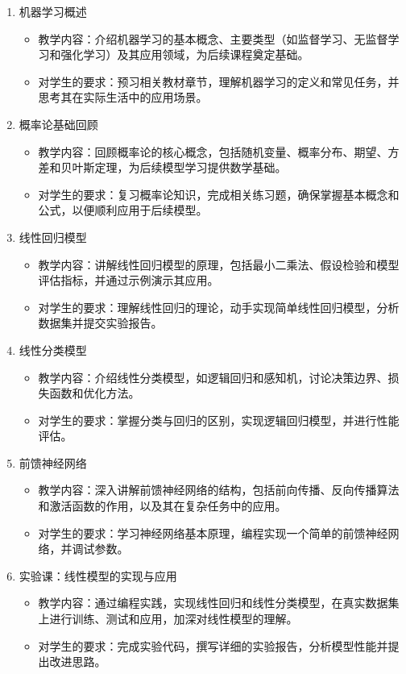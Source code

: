 \documentclass{../nndlcourse}
\begin{document}
\begin{enumerate}
\item 机器学习概述
\begin{itemize}
\item 教学内容：介绍机器学习的基本概念、主要类型（如监督学习、无监督学习和强化学习）及其应用领域，为后续课程奠定基础。
\item 对学生的要求：预习相关教材章节，理解机器学习的定义和常见任务，并思考其在实际生活中的应用场景。
\end{itemize}

\item 概率论基础回顾 
\begin{itemize}
    \item 教学内容：回顾概率论的核心概念，包括随机变量、概率分布、期望、方差和贝叶斯定理，为后续模型学习提供数学基础。
    \item 对学生的要求：复习概率论知识，完成相关练习题，确保掌握基本概念和公式，以便顺利应用于后续模型。
\end{itemize}

\item 线性回归模型
\begin{itemize}
    \item 教学内容：讲解线性回归模型的原理，包括最小二乘法、假设检验和模型评估指标，并通过示例演示其应用。
    \item 对学生的要求：理解线性回归的理论，动手实现简单线性回归模型，分析数据集并提交实验报告。
\end{itemize}

\item 线性分类模型
\begin{itemize}
    \item 教学内容：介绍线性分类模型，如逻辑回归和感知机，讨论决策边界、损失函数和优化方法。
    \item 对学生的要求：掌握分类与回归的区别，实现逻辑回归模型，并进行性能评估。
\end{itemize}

\item 前馈神经网络
\begin{itemize}
    \item 教学内容：深入讲解前馈神经网络的结构，包括前向传播、反向传播算法和激活函数的作用，以及其在复杂任务中的应用。
    \item 对学生的要求：学习神经网络基本原理，编程实现一个简单的前馈神经网络，并调试参数。
\end{itemize}

\item 实验课：线性模型的实现与应用
\begin{itemize}
    \item 教学内容：通过编程实践，实现线性回归和线性分类模型，在真实数据集上进行训练、测试和应用，加深对线性模型的理解。
    \item 对学生的要求：完成实验代码，撰写详细的实验报告，分析模型性能并提出改进思路。
\end{itemize}


\end{enumerate}
\end{document}
